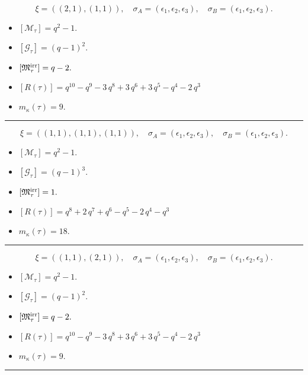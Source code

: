 \documentclass[10pt,a4paper]{amsart}
\begin{document}
$$\xi = ({(2, 1)}, {(1, 1)}),\quad \sigma_A = ({{\epsilon_1, \epsilon_2}}, {{\epsilon_3}}),\quad \sigma_B = ({{\epsilon_1, \epsilon_2}}, {{\epsilon_3}}).$$

\begin{itemize}
 \item $[\mathcal{M}_{\tau}] = q^{2} - 1 .$

 \item $[\mathcal{G}_{\tau}] = {\left(q - 1\right)}^{2} .$

 \item $[{\frak M}_{\tau}^{\textrm{irr}}] = q - 2 .$

 \item $[R(\tau)] = q^{10} - q^{9} - 3 \, q^{8} + 3 \, q^{6} + 3 \, q^{5} - q^{4} - 2 \, q^{3} $

 \item $m_{\kappa}(\tau) = 9 .$

 \end{itemize}
\noindent\rule{8cm}{0.4pt}

$$\xi = ({(1, 1), (1, 1)}, {(1, 1)}),\quad \sigma_A = ({{\epsilon_1}, {\epsilon_2}}, {{\epsilon_3}}),\quad \sigma_B = ({{\epsilon_1}, {\epsilon_2}}, {{\epsilon_3}}).$$

\begin{itemize}
 \item $[\mathcal{M}_{\tau}] = q^{2} - 1 .$

 \item $[\mathcal{G}_{\tau}] = {\left(q - 1\right)}^{3} .$

 \item $[{\frak M}_{\tau}^{\textrm{irr}}] = 1 .$

 \item $[R(\tau)] = q^{8} + 2 \, q^{7} + q^{6} - q^{5} - 2 \, q^{4} - q^{3} $

 \item $m_{\kappa}(\tau) = 18 .$

 \end{itemize}
\noindent\rule{8cm}{0.4pt}

$$\xi = ({(1, 1)}, {(2, 1)}),\quad \sigma_A = ({{\epsilon_1}}, {{\epsilon_2, \epsilon_3}}),\quad \sigma_B = ({{\epsilon_1}}, {{\epsilon_2, \epsilon_3}}).$$

\begin{itemize}
 \item $[\mathcal{M}_{\tau}] = q^{2} - 1 .$

 \item $[\mathcal{G}_{\tau}] = {\left(q - 1\right)}^{2} .$

 \item $[{\frak M}_{\tau}^{\textrm{irr}}] = q - 2 .$

 \item $[R(\tau)] = q^{10} - q^{9} - 3 \, q^{8} + 3 \, q^{6} + 3 \, q^{5} - q^{4} - 2 \, q^{3} $

 \item $m_{\kappa}(\tau) = 9 .$

 \end{itemize}
\noindent\rule{8cm}{0.4pt}
\end{document}
